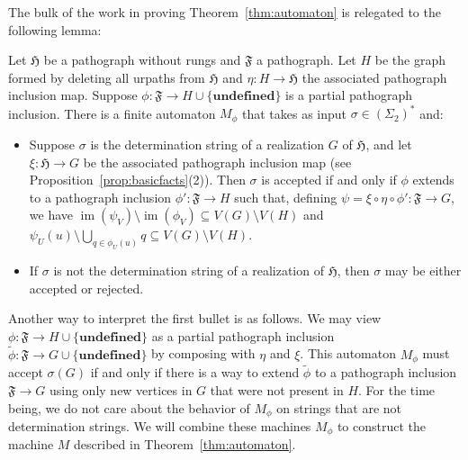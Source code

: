 \documentclass{article}
\newcommand{\Ff}{\mathfrak{F}}
\newcommand{\Hf}{\mathfrak{H}}
\newcommand{\ud}{\mathbf{undefined}}
\DeclareMathOperator{\im}{im}
\begin{document}
The bulk of the work in proving Theorem~\ref{thm:automaton} is relegated to the following lemma:
\begin{lemma}
Let $\Hf$ be a pathograph without rungs and $\Ff$ a pathograph. Let $H$ be the graph formed by deleting all urpaths from $\Hf$ and $\eta:H\to \Hf$ the associated pathograph inclusion map. Suppose $\phi:\Ff\to H\cup\{\ud\}$ is a partial pathograph inclusion. There is a finite automaton $M_\phi$ that takes as input $\sigma\in (\Sigma_2)^*$ and:
\begin{itemize}
    \item Suppose $\sigma$ is the determination string of a realization $G$ of $\Hf$, and let $\xi:\Hf\to G$ be the associated pathograph inclusion map (see Proposition~\ref{prop:basicfacts}(2)). Then $\sigma$ is accepted if and only if $\phi$ extends to a pathograph inclusion $\phi':\Ff\to H$ such that, defining $\psi=\xi\circ\eta\circ\phi':\Ff\to G$, we have $\im(\psi_V)\setminus \im(\phi_V)\subseteq V(G)\setminus V(H)$ and $\psi_U(u)\setminus \bigcup_{q\in \phi_U(u)}q\subseteq V(G)\setminus V(H)$.
    \item If $\sigma$ is not the determination string of a realization of $\Hf$, then $\sigma$ may be either accepted or rejected.
\end{itemize}
\end{lemma}
Another way to interpret the first bullet is as follows. We may view $\phi:\Ff\to H\cup\{\ud\}$ as a partial pathograph inclusion $\tilde{\phi}:\Ff\to G\cup\{\ud\}$ by composing with $\eta$ and $\xi$. This automaton $M_\phi$ must accept $\sigma(G)$ if and only if there is a way to extend $\tilde{\phi}$ to a pathograph inclusion $\Ff\to G$ using only new vertices in $G$ that were not present in $H$. For the time being, we do not care about the behavior of $M_\phi$ on strings that are not determination strings. We will combine these machines $M_\phi$ to construct the machine $M$ described in Theorem~\ref{thm:automaton}.
\end{document}
